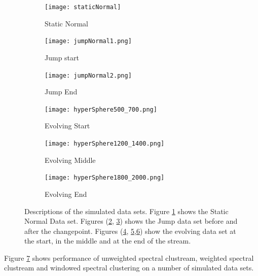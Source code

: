 \begin{figure}[h!]
\begin{subfigure}{.33\textwidth}
  \centering
  \texttt{[image: staticNormal]}
  \caption{Static Normal}
  \label{fig:simdata1}
\end{subfigure}
\begin{subfigure}{.33\textwidth}
  \centering
  \texttt{[image: jumpNormal1.png]}
  \caption{Jump start}
 \label{fig:simdata2}
\end{subfigure}%
\begin{subfigure}{.33\textwidth}
  \centering
  \texttt{[image: jumpNormal2.png]}
  \caption{Jump End}
  \label{fig:simdata3}
\end{subfigure}
\begin{subfigure}{.33\textwidth}
  \centering
  \texttt{[image: hyperSphere500\_700.png]}
  \caption{Evolving Start}
 \label{fig:simdata4}
\end{subfigure}%
\begin{subfigure}{.33\textwidth}
  \centering
  \texttt{[image: hyperSphere1200\_1400.png]}
  \caption{Evolving Middle}
  \label{fig:simdata5}
\end{subfigure}
\begin{subfigure}{.33\textwidth}
  \centering
  \texttt{[image: hyperSphere1800\_2000.png]}
  \caption{Evolving End}
 \label{fig:simdata6}
\end{subfigure}%
\caption{Descriptions of the simulated data sets. Figure \ref{fig:simdata1} shows the Static Normal Data set. Figures (\ref{fig:simdata2}, \ref{fig:simdata3}) shows the Jump data set before and after the changepoint. Figures (\ref{fig:simdata4}, \ref{fig:simdata5},\ref{fig:simdata6}) show the evolving data set at the start, in the middle and at the end of the stream.  }
\label{fig:simulated_clustream}
\end{figure}

 Figure \ref{fig:simulated_clustream} shows performance of unweighted spectral clustream, weighted spectral clustream and windowed spectral clustering on a number of simulated data sets. 

